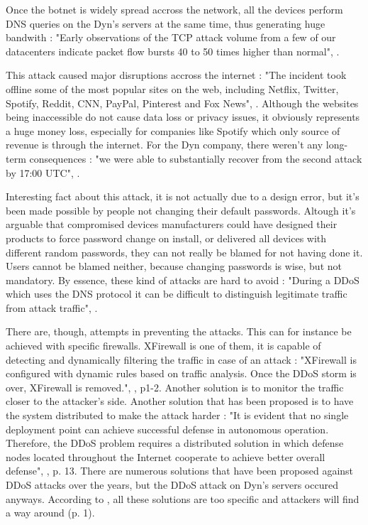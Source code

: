 \documentclass[a4paper,man,natbib,12]{apa6}
\begin{document}
\qquad Once the botnet is widely spread accross the network, all the devices perform DNS queries on the Dyn's servers at the same time, thus generating huge bandwith : "Early observations of the TCP attack volume from a few of our datacenters indicate packet flow bursts 40 to 50 times higher than normal", \cite{Dyn}. 

\qquad This attack caused major disruptions accross the internet : "The incident took offline some of the most popular sites on the web, including Netflix, Twitter, Spotify, Reddit, CNN, PayPal, Pinterest and Fox News", \cite{guardian}. Although the websites being inaccessible do not cause data loss or privacy issues, it obviously represents a huge money loss, especially for companies like Spotify which only source of revenue is through the internet. For the Dyn company, there weren't any long-term consequences : "we were able to substantially recover from the second attack by 17:00 UTC", \cite{Dyn}.

\qquad Interesting fact about this attack, it is not actually due to a design error, but it's been made possible by people not changing their default passwords. Altough it's arguable that compromised devices manufacturers could have designed their products to force password change on install, or delivered all devices with different random passwords, they can not really be blamed for not having done it. Users cannot be blamed neither, because changing passwords is wise, but not mandatory. By essence, these kind of attacks are hard to avoid : "During a DDoS which uses the DNS protocol it can be difficult to distinguish legitimate traffic from attack traffic", \cite{Dyn}. 

\qquad There are, though, attempts in preventing the attacks. This can for instance be achieved with specific firewalls. XFirewall is one of them, it is capable of detecting and dynamically filtering the traffic in case of an attack : "XFirewall is configured with dynamic rules based on traffic analysis. Once the DDoS storm is over, XFirewall is removed.", \cite{XFirewall}, p1-2. Another solution is to monitor the traffic closer to the attacker's side. Another solution that has been proposed is to have the system distributed to make the attack harder : "It is evident that no single deployment point can achieve successful defense in autonomous operation. Therefore, the
DDoS problem requires a distributed solution in which defense nodes located throughout the Internet cooperate to achieve better overall defense", \cite{Mirkovic:2003:AFD:986655.986658}, p. 13. There are numerous solutions that have been proposed against DDoS attacks over the years, but the DDoS attack on Dyn's servers occured anyways. According to \cite{Mirkovic:2003:AFD:986655.986658}, all these solutions are too specific and attackers will find a way around (p. 1).
\end{document}
